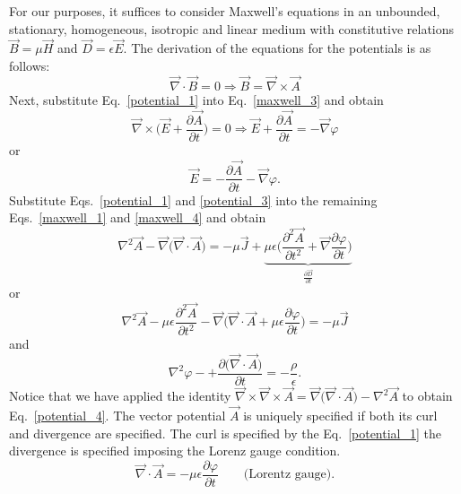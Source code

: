 \documentclass[11pt,a4paper,oneside]{book}
\numberwithin{equation}{section}
\theoremstyle{it}
\theoremstyle{definition}
\begin{document}
For our purposes, it suffices to consider Maxwell's equations in an unbounded, stationary, homogeneous, isotropic and linear medium with constitutive relations $\vec{B}=\mu\vec{H}$ and $\vec{D}=\epsilon\vec{E}$. The derivation of the equations for the potentials is as follows:
 \begin{equation}\label{potential_1}
 	\vec{\nabla} \cdot \vec{B} = 0 \Rightarrow \vec{B} = \vec{\nabla}\times\vec{A}
 \end{equation}
Next, substitute Eq.~\eqref{potential_1} into Eq.~\eqref{maxwell_3} and obtain
 \begin{equation*}\label{potential_2}
	\vec{\nabla} \times \Big(\vec{E}+\frac{\partial \vec{A}}{\partial t}\Big) = 0 \Rightarrow \vec{E}+\frac{\partial \vec{A}}{\partial t} = -\vec{\nabla}\varphi
\end{equation*}
or 
 \begin{equation}\label{potential_3}
	\vec{E} =  -\frac{\partial \vec{A}}{\partial t} -\vec{\nabla}\varphi.
\end{equation}
Substitute Eqs.~\eqref{potential_1} and \ref{potential_3} into the remaining Eqs.~\eqref{maxwell_1} and \ref{maxwell_4} and obtain
\begin{equation}\label{potential_4}
	\nabla^2\vec{A}-\vec{\nabla}\big(\vec{\nabla}\cdot\vec{A}\big) = -\mu\vec{J}+\underbrace{\mu\epsilon\Big(\frac{\partial^2\vec{A}}{\partial t^2}+\vec{\nabla}\frac{\partial \varphi}{\partial t}\Big)}_{\frac{\partial\vec{D}}{\partial t}}
\end{equation}
or
\begin{equation}\label{potential_5}
	\nabla^2\vec{A}-\mu\epsilon\frac{\partial^2\vec{A}}{\partial t^2} - \vec{\nabla}\Big(\vec{\nabla}\cdot\vec{A}+\mu\epsilon\frac{\partial\varphi}{\partial t}\Big) = -\mu\vec{J}
\end{equation}
and
\begin{equation}\label{potential_6}
	\nabla^2\varphi-+ \frac{\partial \big(\vec{\nabla}\cdot\vec{A}\big)}{\partial t} = -\frac{\rho}{\epsilon}.
\end{equation}
Notice that we have applied the identity $\vec{\nabla}\times\vec{\nabla}\times\vec{A} = \vec{\nabla}\big(\vec{\nabla}\cdot\vec{A}\big)-\nabla^2\vec{A}$ to obtain Eq.~\eqref{potential_4}. The vector potential $\vec{A}$ is uniquely specified if both its curl and divergence are specified. The curl is specified by the Eq.~\eqref{potential_1} the divergence is specified imposing the Lorenz gauge condition.
\begin{equation}\label{potential_7}
\boxed{	\vec{\nabla}\cdot\vec{A}= -\mu\epsilon\frac{\partial\varphi}{\partial t}\qquad\text{(Lorentz gauge).}}
\end{equation}
\end{document}
